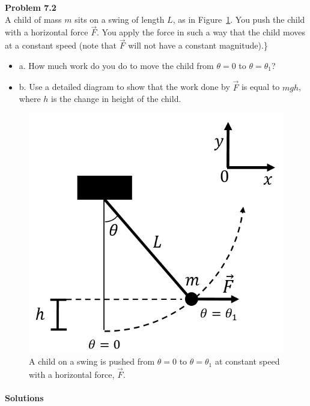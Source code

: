 \begin{framed}
\textbf{Problem 7.2}\\
A child of mass $m$ sits on a swing of length $L$, as in Figure~\ref{fig:workenergy:swingprob}. You push the child with a horizontal force $\vec F$. You apply the force in such a way that the child moves at a constant speed (note that $\vec F$ will not have a constant magnitude).\}

\begin{itemize}
\item a. How much work do you do to move the child from $\theta=0$ to $\theta=\theta_1$?
\item b.  Use a detailed diagram to show that the work done by $\vec F$ is equal to $mgh$, where $h$ is the change in height of the child.
\end{itemize}

\begin{figure}[!htbp]
\centering
\includegraphics[width=0.4\linewidth]{files/swingprob-d71c20d72bf5df16dc390c24266b1394.png}
\caption[]{A child on a swing is pushed from $\theta=0$ to $\theta=\theta_1$ at constant speed with a horizontal force, $\vec F$.}
\label{fig:workenergy:swingprob}
\end{figure}
\end{framed}

\paragraph{Solutions}

